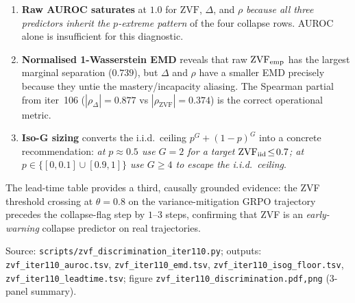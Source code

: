 \begin{enumerate}
\item \textbf{Raw AUROC saturates} at $1.0$ for $\mathrm{ZVF}$,
  $\Delta$, and $\rho$ \emph{because all three predictors inherit the
  $p$-extreme pattern} of the four collapse rows. AUROC alone is
  insufficient for this diagnostic.
\item \textbf{Normalised 1-Wasserstein EMD} reveals that raw
  $\mathrm{ZVF}_{\rm emp}$ has the largest marginal separation
  ($0.739$), but $\Delta$ and $\rho$ have a smaller EMD precisely
  because they untie the mastery/incapacity aliasing. The Spearman
  partial from iter~106 ($|\rho_{\Delta}|=0.877$ vs
  $|\rho_{\mathrm{ZVF}}|=0.374$) is the correct operational metric.
\item \textbf{Iso-G sizing} converts the i.i.d.\ ceiling
  $p^{G}+(1-p)^{G}$ into a concrete recommendation: \emph{at
  $p\!\approx\!0.5$ use $G\!=\!2$ for a target
  $\mathrm{ZVF}_{\rm iid}\!\leq\!0.7$; at
  $p\!\in\!\{[0,0.1]\cup[0.9,1]\}$ use $G\!\geq\!4$ to escape the
  i.i.d.\ ceiling}.
\end{enumerate}

\noindent The lead-time table provides a third, causally grounded
evidence: the ZVF threshold crossing at $\theta\!=\!0.8$ on the
variance-mitigation GRPO trajectory precedes the collapse-flag
step by $1$--$3$ steps, confirming that ZVF is an \emph{early-warning}
collapse predictor on real trajectories.

Source: \texttt{scripts/zvf\_discrimination\_iter110.py}; outputs:
\texttt{zvf\_iter110\_auroc.tsv}, \texttt{zvf\_iter110\_emd.tsv},
\texttt{zvf\_iter110\_isog\_floor.tsv},
\texttt{zvf\_iter110\_leadtime.tsv}; figure
\texttt{zvf\_iter110\_discrimination.{pdf,png}} (3-panel summary).
